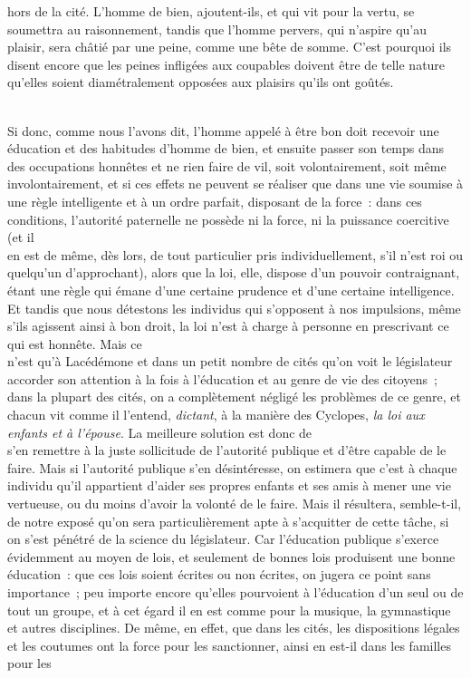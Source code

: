 \documentclass[french,twoside]{book} %
\begin{document}
hors de la cité. L’homme de bien, ajoutent-ils, et qui vit pour la vertu, se soumettra au raisonnement, tandis que l’homme pervers, qui n’aspire qu’au plaisir, sera châtié par une peine, comme une bête de somme. C’est pourquoi ils disent encore que les peines infligées aux coupables doivent être de telle nature qu’elles soient diamétralement opposées aux plaisirs qu’ils ont goûtés.\par
\\
Si donc, comme nous l’avons dit, l’homme appelé à être bon doit recevoir une éducation et des habitudes d’homme de bien, et ensuite passer son temps dans des occupations honnêtes et ne rien faire de vil, soit volontairement, soit même involontairement, et si ces effets ne peuvent se réaliser que dans une vie soumise à une règle intelligente et à un ordre parfait, disposant de la force : dans ces conditions, l’autorité paternelle ne possède ni la force, ni la puissance coercitive (et il \\
en est de même, dès lors, de tout particulier pris individuellement, s’il n’est roi ou quelqu’un d’approchant), alors que la loi, elle, dispose d’un pouvoir contraignant, étant une règle qui émane d’une certaine prudence et d’une certaine intelligence. Et tandis que nous détestons les individus qui s’opposent à nos impulsions, même s’ils agissent ainsi à bon droit, la loi n’est à charge à personne en prescrivant ce qui est honnête. Mais ce \\
n’est qu’à Lacédémone et dans un petit nombre de cités qu’on voit le législateur accorder son attention à la fois à l’éducation et au genre de vie des citoyens ; dans la plupart des cités, on a complètement négligé les problèmes de ce genre, et chacun vit comme il l’entend, {\itshape dictant}, à la manière des Cyclopes, {\itshape la loi aux enfants et à l’épouse}. La meilleure solution est donc de \\
s’en remettre à la juste sollicitude de l’autorité publique et d’être capable de le faire. Mais si l’autorité publique s’en désintéresse, on estimera que c’est à chaque individu qu’il appartient d’aider ses propres enfants et ses amis à mener une vie vertueuse, ou du moins d’avoir la volonté de le faire. Mais il résultera, semble-t-il, de notre exposé qu’on sera particulièrement apte à s’acquitter de cette tâche, si on s’est pénétré de la science du législateur. Car l’éducation publique s’exerce \\
évidemment au moyen de lois, et seulement de bonnes lois produisent une bonne éducation : que ces lois soient écrites ou  non écrites, on jugera ce point sans importance ; peu importe encore qu’elles pourvoient à l’éducation d’un seul ou de tout un groupe, et à cet égard il en est comme pour la musique, la gymnastique et autres disciplines. De même, en effet, que dans les cités, les dispositions légales et les coutumes ont la force pour les sanctionner, ainsi en est-il dans les familles pour les \\
\end{document}
